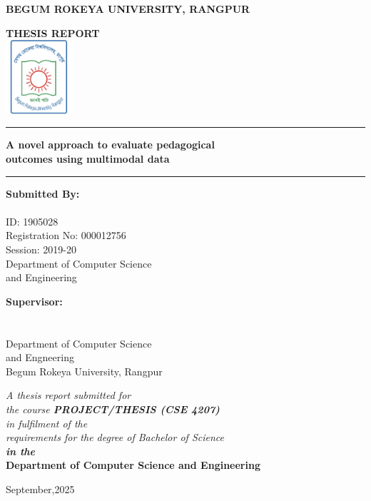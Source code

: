 \begin{titlepage}
\begin{center}
{\Large \textbf{BEGUM ROKEYA UNIVERSITY, RANGPUR}}

\vspace{1cm}
{ \textbf{THESIS REPORT}}\\
\vspace{0.5cm}
\includegraphics[width=2.5cm]{sections/logo.jpg}\\

\vspace{0.5cm}
\rule{\textwidth\color{pearsongray}}{0.4pt}

\vspace{0.2cm}
{\Large\textbf{A novel approach to evaluate pedagogical}}\\[0.2cm]
{\Large\textbf{outcomes using multimodal data}}
\vspace{0.2cm}

\rule{\textwidth\color{pearsongray}}{0.4pt}

\vspace{1.5cm}
\begin{minipage}[t]{0.45\textwidth}
\textbf{Submitted By:}\\
\theauthor\\
ID: 1905028\\
Registration No: 000012756\\
Session: 2019-20\\
Department of Computer Science \\and Engineering
\end{minipage}
\hfill
\begin{minipage}[t]{0.45\textwidth}
\textbf{Supervisor:}\\
\thesupervisor\\
\thesupervisortitle\\
Department of Computer Science\\ and Engneering\\
Begum Rokeya University, Rangpur
\end{minipage}

\vspace{1.5cm}
\textit{A thesis report submitted for\\
the course \textbf{PROJECT/THESIS (CSE 4207)}\\
in fulfilment of the\\
requirements for the degree of Bachelor of Science\\
\textbf{in the}}\\
\large \textbf{Department of Computer Science and Engineering}

\vspace{0.5cm}
\small September,2025
\end{center}
\end{titlepage}
